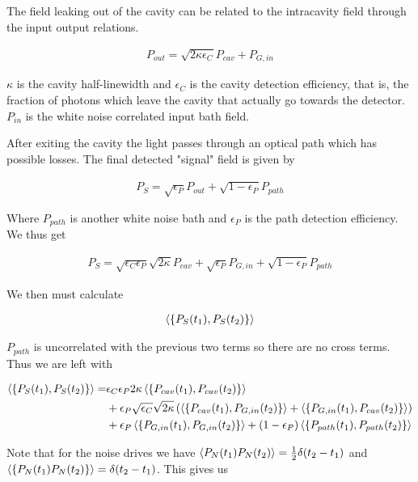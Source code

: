 \documentclass[12pt]{article}
\begin{document}
The field leaking out of the cavity can be related to the intracavity field through the input output relations.

\begin{align}
P_{out} = \sqrt{2\kappa\epsilon_C}P_{cav} + P_{G, in}
\end{align}

$\kappa$ is the cavity half-linewidth and $\epsilon_C$ is the cavity detection efficiency, that is, the fraction of photons which leave the cavity that actually go towards the detector. $P_{in}$ is the white noise correlated input bath field.

After exiting the cavity the light passes through an optical path which has possible losses. The final detected "signal" field is given by

\begin{align}
P_S = \sqrt{\epsilon_P}P_{out} + \sqrt{1-\epsilon_P}P_{path}
\end{align}

Where $P_{path}$ is another white noise bath and $\epsilon_P$ is the path detection efficiency. We thus get

\begin{align}
P_S = \sqrt{\epsilon_C\epsilon_P}\sqrt{2\kappa}P_{cav} + \sqrt{\epsilon_P}P_{G, in} + \sqrt{1-\epsilon_P}P_{path}
\end{align}

We then must calculate

\begin{align}
\Braket{\left\{P_S(t_1), P_S(t_2)\right\}}
\end{align}

$P_{path}$ is uncorrelated with the previous two terms so there are no cross terms. Thus we are left with

\begin{align}
\Braket{\left\{P_S(t_1), P_S(t_2)\right\}} =& \epsilon_C \epsilon_P 2\kappa \Braket{\left\{P_{cav}(t_1), P_{cav}(t_2)\right\}} \\
&+ \epsilon_P\sqrt{\epsilon_C}\sqrt{2\kappa}\left(\Braket{\left\{P_{cav}(t_1), P_{G,in}(t_2)\right\}} + \Braket{\left\{P_{G,in}(t_1), P_{cav}(t_2)\right\}}\right)\\
&+ \epsilon_P \Braket{\left\{P_{G,in}(t_1), P_{G,in}(t_2)\right\}} + (1-\epsilon_P)\Braket{\left\{P_{path}(t_1), P_{path}(t_2)\right\}}
\end{align}

Note that for the noise drives we have $\Braket{P_N(t_1)P_N(t_2)} = \frac{1}{2}\delta(t_2-t_1)$ and $\Braket{\left\{P_N(t_1)P_N(t_2)\right\}} = \delta(t_2-t_1)$. This gives us
\end{document}
